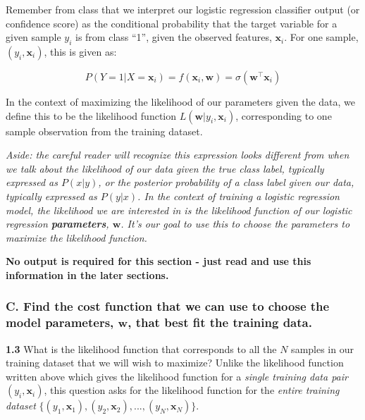 \documentclass[
  letterpaper,
  DIV=11,
  numbers=noendperiod]{scrartcl}
\begin{document}
Remember from class that we interpret our logistic regression classifier
output (or confidence score) as the conditional probability that the
target variable for a given sample \(y_i\) is from class ``1'', given
the observed features, \(\mathbf{x}_i\). For one sample,
\((y_i, \mathbf{x}_i)\), this is given as:

\[P(Y=1|X=\mathbf{x}_i) = f(\mathbf{x}_i,\mathbf{w})=\sigma(\mathbf{w}^{\top} \mathbf{x}_i)\]

In the context of maximizing the likelihood of our parameters given the
data, we define this to be the likelihood function
\(L(\mathbf{w}|y_i,\mathbf{x}_i)\), corresponding to one sample
observation from the training dataset.

\emph{Aside: the careful reader will recognize this expression looks
different from when we talk about the likelihood of our data given the
true class label, typically expressed as \(P(x|y)\), or the posterior
probability of a class label given our data, typically expressed as
\(P(y|x)\). In the context of training a logistic regression model, the
likelihood we are interested in is the likelihood function of our
logistic regression \textbf{parameters}, \(\mathbf{w}\). It's our goal
to use this to choose the parameters to maximize the likelihood
function.}

\textbf{No output is required for this section - just read and use this
information in the later sections.}

\subsubsection{\texorpdfstring{C. Find the cost function that we can use
to choose the model parameters, \(\mathbf{w}\), that best fit the
training
data.}{C. Find the cost function that we can use to choose the model parameters, \textbackslash mathbf\{w\}, that best fit the training data.}}\label{c.-find-the-cost-function-that-we-can-use-to-choose-the-model-parameters-mathbfw-that-best-fit-the-training-data.}

\textbf{1.3} What is the likelihood function that corresponds to all the
\(N\) samples in our training dataset that we will wish to maximize?
Unlike the likelihood function written above which gives the likelihood
function for a \emph{single training data pair} \((y_i, \mathbf{x}_i)\),
this question asks for the likelihood function for the \emph{entire
training dataset}
\(\{(y_1, \mathbf{x}_1), (y_2, \mathbf{x}_2), ..., (y_N, \mathbf{x}_N)\}\).
\end{document}
